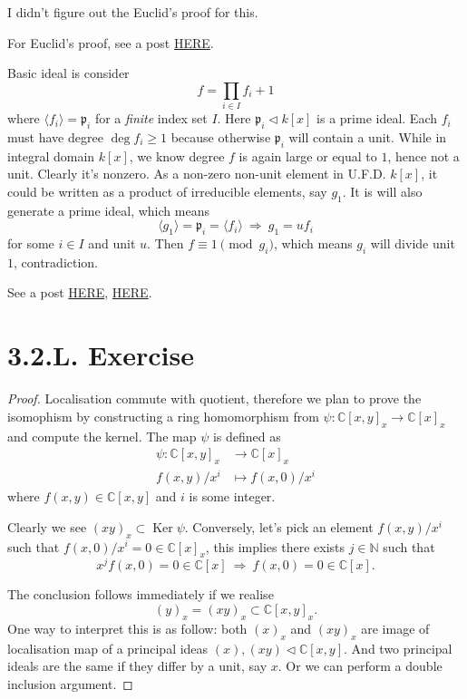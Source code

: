 I didn't figure out the Euclid's proof for this. 

For Euclid's proof, see a post \href{https://math.stackexchange.com/questions/80389/ring-of-polynomials-over-a-field-has-infinitely-many-primes}{HERE}.

Basic ideal is consider 
\[f=\prod_{i\in I}f_i+1\]
where $\langle f_i\rangle=\mathfrak p_i$ for a \textit{finite} index set $I$. Here $\mathfrak p_i\triangleleft k[x]$ is a prime ideal. Each $f_i$ must have degree $\operatorname{deg}f_i\geq 1$ because otherwise $\mathfrak p_i$ will contain a unit. While in integral domain $k[x]$, we know degree $f$ is again large or equal to $1$, hence not a unit. Clearly it's nonzero. As a non-zero non-unit element in U.F.D. $k[x]$, it could be written as a product of irreducible elements, say $g_1$. It is will also generate a prime ideal, which means \[\langle g_1\rangle =\mathfrak p_i=\langle f_i\rangle ~\Rightarrow~ g_1=uf_i\] for some $i\in I$ and unit $u$. Then $f\equiv 1\pmod{g_i}$, which means $g_i$ will divide unit $1$, contradiction.

See a post \href{https://math.stackexchange.com/questions/585201/can-operatornamespecrx-ever-be-finite}{HERE}, \href{https://math.stackexchange.com/questions/496202/operatornamespeckx-has-infinite-points}{HERE}.

\section{3.2.L. Exercise}

\begin{proof}
    Localisation commute with quotient, therefore we plan to prove the isomophism by constructing a ring homomorphism from $\psi:\mathbb C[x,y]_x\to \mathbb C[x]_x$ and compute the kernel. 
    The map $\psi$ is defined as 
    \begin{align*}
        \psi:\mathbb C[x,y]_x &\to \mathbb C[x]_x\\
            f(x,y)/x^i &\mapsto f(x,0)/x^i
    \end{align*}where $f(x,y)\in\mathbb C[x,y]$ and $i$ is some integer. 
    
    Clearly we see $(xy)_x\subset\operatorname{Ker}\psi$. Conversely, let's pick an element $f(x,y)/x^i$ such that $f(x,0)/x^i=0\in \mathbb C[x]_x$, this implies there exists $j\in\mathbb N$ such that 
    \[x^jf(x,0)=0\in\mathbb C[x] ~\Rightarrow~ f(x,0)=0\in\mathbb C[x].\] 

    The conclusion follows immediately if we realise 
    \[(y)_x=(xy)_x\subset \mathbb C[x,y]_x.\]
    One way to interpret this is as follow: both $(x)_x$ and $(xy)_x$ are image of localisation map of a principal ideas $(x),(xy)\triangleleft\mathbb C[x,y]$. And two principal ideals are the same if they differ by a unit, say $x$. Or we can perform a double inclusion argument.
\end{proof}


